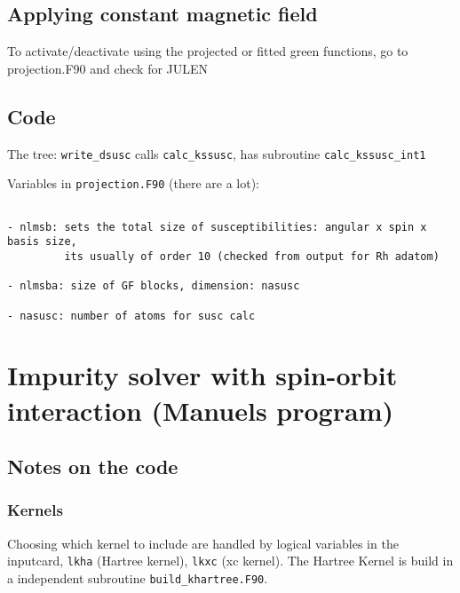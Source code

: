 \documentclass[11pt,fleqn]{book} %
\begin{document}
\subsection{Applying constant magnetic field}



To activate/deactivate using the projected or fitted green functions, go to projection.F90
and check for JULEN

\subsection{Code}


The tree: \verb|write_dsusc| calls \verb|calc_kssusc|, has subroutine \verb|calc_kssusc_int1|


Variables in \verb|projection.F90| (there are a lot):

\begin{VBox}
\begin{verbatim}

- nlmsb: sets the total size of susceptibilities: angular x spin x basis size,
         its usually of order 10 (checked from output for Rh adatom)

- nlmsba: size of GF blocks, dimension: nasusc

- nasusc: number of atoms for susc calc

\end{verbatim}
\end{VBox}

\newpage

\section{Impurity solver with spin-orbit interaction (Manuels program)}
\label{sec:SOC}

\subsection{Notes on the code}

\subsubsection{Kernels}

Choosing which kernel to include are handled by logical variables
in the inputcard, \verb|lkha| (Hartree kernel),   \verb|lkxc| (xc kernel).
The Hartree Kernel is build in a independent subroutine  \verb|build_khartree.F90|.
\end{document}
